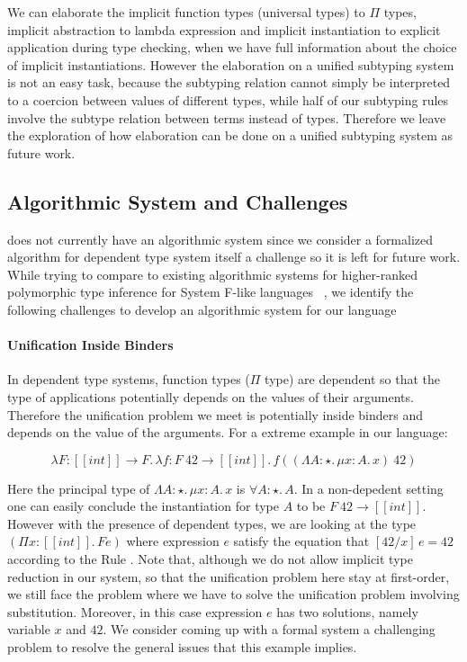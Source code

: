 We can elaborate the implicit function types (universal types) to $\Pi$ types,
implicit abstraction to lambda expression and implicit instantiation to explicit
application during type checking, when we have full information about the
choice of implicit instantiations. However the elaboration on a unified subtyping
system is not an easy task, because the subtyping relation cannot simply be interpreted
to a coercion between values of different types, while half of our subtyping
rules involve the subtype relation between terms instead of types.
Therefore we leave the exploration of how elaboration can be done
on a unified subtyping system as future work.

\subsection{Algorithmic System and Challenges}

\name does not currently have an algorithmic system since we
consider a formalized algorithm for dependent type system itself a challenge so it
is left for future work. While trying to compare to existing algorithmic systems
for higher-ranked polymorphic type inference for System F-like languages
~\cite{dunfield2013complete,zhao19mechanical},
we identify the following challenges to develop an algorithmic system for our language

\paragraph{Unification Inside Binders}
In dependent type systems, function types ($\Pi$ type) are dependent so that
the type of applications potentially depends on the values of their arguments.
Therefore the unification problem we meet is potentially inside binders and
depends on the value of the arguments.
For a extreme example in our language:

\begin{equation*}
    \lambda F : [[int]] \rightarrow F.\, \lambda f : F~42 \rightarrow [[int]].\, f ((\Lambda A : \star.\,\mu x : A.\, x)~42)
\end{equation*}

Here the principal type of $\Lambda A : \star.\,\mu x : A.\, x$ is $\forall A : \star.\, A$.
In a non-depedent setting one can easily conclude the instantiation for type $A$ to be
$F~42 \rightarrow [[int]]$. However with the presence of dependent types,
we are looking at the type $(\Pi x : [[int]].\, F e)$ where expression $e$
satisfy the equation that $[42/x]\,e = 42$ according to the Rule .
Note that, although we do not allow implicit type reduction in our system,
so that the unification problem here stay at first-order, we still face the
problem where we have to solve
the unification problem involving substitution. Moreover, in this case expression
$e$ has two solutions, namely variable $x$ and $42$. We consider coming up with
a formal system a challenging problem to resolve the general issues that this
example implies.

